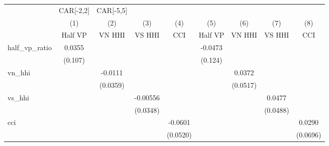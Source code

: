 {
\def\sym#1{\ifmmode^{#1}\else\(^{#1}\)\fi}
\begin{tabular}{l*{8}{c}}
\hline\hline
                    &\multicolumn{1}{c}{CAR[-2,2]}&\multicolumn{1}{c}{CAR[-5,5]}&\multicolumn{1}{c}{} &\multicolumn{5}{c}{}                                                                                         \\
                    &\multicolumn{1}{c}{(1)}&\multicolumn{1}{c}{(2)}&\multicolumn{1}{c}{(3)}&\multicolumn{1}{c}{(4)}&\multicolumn{1}{c}{(5)}&\multicolumn{1}{c}{(6)}&\multicolumn{1}{c}{(7)}&\multicolumn{1}{c}{(8)}\\
                    &\multicolumn{1}{c}{Half VP}&\multicolumn{1}{c}{VN HHI}&\multicolumn{1}{c}{VS HHI}&\multicolumn{1}{c}{CCI}&\multicolumn{1}{c}{Half VP}&\multicolumn{1}{c}{VN HHI}&\multicolumn{1}{c}{VS HHI}&\multicolumn{1}{c}{CCI}\\
\hline
half\_vp\_ratio       &      0.0355         &                     &                     &                     &     -0.0473         &                     &                     &                     \\
                    &     (0.107)         &                     &                     &                     &     (0.124)         &                     &                     &                     \\
vn\_hhi              &                     &     -0.0111         &                     &                     &                     &      0.0372         &                     &                     \\
                    &                     &    (0.0359)         &                     &                     &                     &    (0.0517)         &                     &                     \\
vs\_hhi              &                     &                     &    -0.00556         &                     &                     &                     &      0.0477         &                     \\
                    &                     &                     &    (0.0348)         &                     &                     &                     &    (0.0488)         &                     \\
cci                 &                     &                     &                     &     -0.0601         &                     &                     &                     &      0.0290         \\
                    &                     &                     &                     &    (0.0520)         &                     &                     &                     &    (0.0696)         \\

\end{tabular}}
